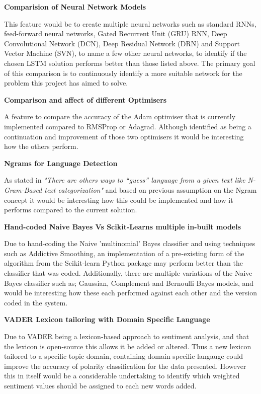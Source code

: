 \documentclass[oneside, 12pt]{article}
\begin{document}
		\textbf{Comparision of Neural Network Models}
		
		This feature would be to create multiple neural networks such as standard RNNs, feed-forward neural networks, Gated Recurrent Unit (GRU) RNN, Deep Convolutional Network (DCN), Deep Residual Network (DRN) and Support Vector Machine (SVN), to name a few other neural networks, to identify if the chosen LSTM solution performs better than those listed above. The primary goal of this comparison is to continuously identify a more suitable network for the problem this project has aimed to solve.
		\newline
		
		\textbf{Comparison and affect of different Optimisers}
		
		A feature to compare the accuracy of the Adam optimiser that is currently implemented compared to RMSProp or Adagrad. Although identified as being a continuation and improvement of those two optimisers it would be interesting how the others perform.
		\newline
		
		\textbf{Ngrams for Language Detection}
		
		As stated in \cite{langdectNLTK} \textit{"There are others ways to “guess” language from a given text like N-Gram-Based text categorization"} and based on previous assumption on the Ngram concept it would be interesting how this could be implemented and how it performs compared to the current solution.
		\newline
		
		\textbf{Hand-coded Naive Bayes Vs Scikit-Learns multiple in-built models}
		
		Due to hand-coding the Naive 'multinomial' Bayes classifier and using techniques such as Addictive Smoothing, an implementation of a pre-existing form of the algorithm from the Scikit-learn Python package may perform better than the classifier that was coded. Additionally, there are multiple variations of the Naive Bayes classifier such as; Gaussian, Complement and Bernoulli Bayes models, and would be interesting how these each performed against each other and the version coded in the system.
		\newline
		
		\textbf{VADER Lexicon tailoring with Domain Specific Language}
		
		Due to VADER being a lexicon-based approach to sentiment analysis, and that the lexicon is open-source this allows it be added or altered. Thus a new lexicon tailored to a specific topic domain, containing domain specific langauge could improve the accuracy of polarity classification for the data presented. However this in itself would be a considerable undertaking to identify which weighted sentiment values should be assigned to each new words added.
		\newline
		
\end{document}
